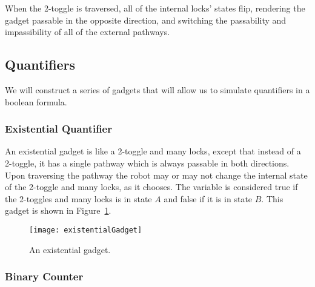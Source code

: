 
When the 2-toggle is traversed, all of the internal locks' states flip, rendering the gadget passable in the opposite direction, and switching the passability and impassibility of all of the external pathways.

\subsection{Quantifiers}

We will construct a series of gadgets that will allow us to simulate quantifiers in a boolean formula.

\subsubsection{Existential Quantifier}
An existential gadget is like a 2-toggle and many locks, except that instead of a
2-toggle, it has a single pathway which is always passable in both directions. Upon traversing the pathway
the robot may or may not change the internal state of the 2-toggle and many locks, as it chooses. The variable is 
considered true if the 2-toggles and many locks is in state $A$ and false if it is in state $B$. This gadget
is shown in Figure~\ref{fig:Existential}.

\begin{figure}[h!]
\centering
    \texttt{[image: existentialGadget]}
    \caption{An existential gadget.} %
    \label{fig:Existential}
\end{figure}

\subsubsection{Binary Counter}

